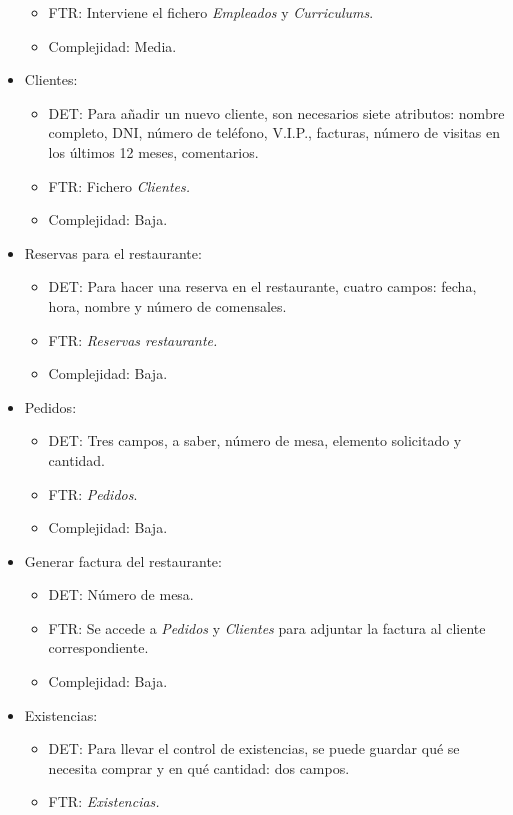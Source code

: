 \documentclass[spanish,a4paper,11pt, twoside]{report}	%
\begin{document}
\begin{itemize}
\begin{itemize}
			\item{FTR:} Interviene el fichero \textit{Empleados} y \textit{Curriculums}.
			\item{Complejidad:} Media.
		\end{itemize}
		\item{Clientes:} 
		\begin{itemize}
 			\item{DET:} Para añadir un nuevo cliente, son necesarios siete atributos: nombre completo, DNI, número de teléfono, V.I.P., facturas, número de visitas en los últimos 12 meses, comentarios.
			\item{FTR:} Fichero \textit{Clientes.}
			\item{Complejidad:} Baja.
		\end{itemize}
		\item{Reservas para el restaurante:} 
		\begin{itemize}
 			\item{DET:} Para hacer una reserva en el restaurante, cuatro campos: fecha, hora, nombre y número de comensales.
			\item{FTR:} \textit{Reservas restaurante.}
			\item{Complejidad:} Baja.
		\end{itemize}
		\item{Pedidos:} 
		\begin{itemize}
 			\item{DET:} Tres campos, a saber, número de mesa, elemento solicitado y cantidad.
			\item{FTR:} \textit{Pedidos}.
			\item{Complejidad:} Baja.
		\end{itemize}
		\item{Generar factura del restaurante:} 
		\begin{itemize}
 			\item{DET:} Número de mesa.
			\item{FTR:} Se accede a \textit{Pedidos} y \textit{Clientes} para adjuntar la factura al cliente correspondiente.
			\item{Complejidad:} Baja.
		\end{itemize}
		\item{Existencias:} 
		\begin{itemize}
 			\item{DET:} Para llevar el control de existencias, se puede guardar qué se necesita comprar y en qué cantidad: dos campos.
			\item{FTR:} \textit{Existencias.}

\end{itemize}
\end{itemize}
\end{document}
